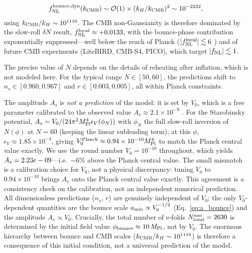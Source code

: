 \documentclass[11pt,a4paper]{article}
\begin{document}
\begin{equation}
f_{\rm NL}^{\rm bounce,dyn}(k_{\rm CMB}) \sim \mathcal{O}(1) \times (k_H/k_{\rm CMB})^2 \sim 10^{-2232},
\end{equation}
using $k_{\rm CMB}/k_H \sim 10^{1116}$. The CMB non-Gaussianity is therefore dominated by the slow-roll $\delta N$ result, $f_{\rm NL}^{\rm local} \approx +0.0133$, with the bounce-phase contribution exponentially suppressed---well below the reach of Planck ($|f_{\rm NL}^{\rm local}| \lesssim 6$ \cite{Planck2018NG}) and of future CMB experiments (LiteBIRD, CMB-S4, PICO), which target $|f_{\rm NL}| \lesssim 1$.

The precise value of $N$ depends on the details of reheating after inflation, which is not modeled here. For the typical range $N \in [50, 60]$, the predictions shift to $n_s \in [0.960, 0.967]$ and $r \in [0.003, 0.005]$, all within Planck constraints.

The amplitude $A_s$ is \emph{not a prediction} of the model: it is set by $V_0$, which is a free parameter calibrated to the observed value $A_s \approx 2.1 \times 10^{-9}$ \cite{Planck2018}. For the Starobinsky potential, $A_s = V_0/(24\pi^2 M_{\rm Pl}^4 \epsilon_V(\phi_{N}))$ with $\phi_{N}$ the full slow-roll inversion of $N(\phi)$ at $N = 60$ (keeping the linear subleading term); at this $\phi$, $\epsilon_V \approx 1.85 \times 10^{-4}$, giving $V_0^{\rm Planck} \approx 0.94 \times 10^{-10} M_{\rm Pl}^4$ to match the Planck central value exactly. We use the round number $V_0 = 10^{-10}$ throughout, which yields $A_s = 2.23e-09$---i.e.\ $\sim 6\%$ above the Planck central value. The small mismatch is a calibration choice for $V_0$, not a physical discrepancy: tuning $V_0$ to $0.94 \times 10^{-10}$ brings $A_s$ onto the Planck central value exactly. This agreement is a consistency check on the calibration, not an independent numerical prediction. All dimensionless predictions ($n_s$, $r$) are genuinely independent of $V_0$; the only $V_0$-dependent quantities are the bounce scale $a_{\rm min} \propto V_0^{-1/2}$ (Eq.~\ref{eq:a_bounce}) and the amplitude $A_s \propto V_0$. Crucially, the total number of e-folds $N_{\rm total}^{\rm sim} = 2630$ is determined by the initial field value $\phi_{\rm bounce} \approx 10\,M_{\rm Pl}$, not by $V_0$. The enormous hierarchy between bounce and CMB scales ($k_{\rm CMB}/k_H \sim 10^{1116}$) is therefore a consequence of this initial condition, not a universal prediction of the model.
\end{document}
